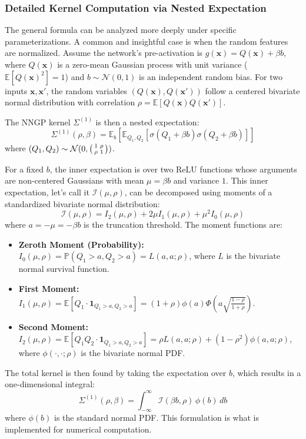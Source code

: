 \documentclass[12pt]{article}
\begin{document}
\subsubsection{Detailed Kernel Computation via Nested Expectation}
The general formula can be analyzed more deeply under specific parameterizations. A common and insightful case is when the random features are normalized. Assume the network's pre-activation is $g(\bm{x}) = Q(\bm{x}) + \beta b$, where $Q(\bm{x})$ is a zero-mean Gaussian process with unit variance ($\mathbb{E}[Q(\bm{x})^2]=1$) and $b \sim \mathcal{N}(0,1)$ is an independent random bias. For two inputs $\bm{x}, \bm{x}'$, the random variables $(Q(\bm{x}), Q(\bm{x}'))$ follow a centered bivariate normal distribution with correlation $\rho = \mathbb{E}[Q(\bm{x})Q(\bm{x}')]$.

The NNGP kernel $\Sigma^{(1)}$ is then a nested expectation:
\begin{equation}
    \Sigma^{(1)}(\rho, \beta) = \mathbb{E}_{b} \left[ \mathbb{E}_{Q_1, Q_2} \left[ \sigma(Q_1 + \beta b) \sigma(Q_2 + \beta b) \right] \right]
\end{equation}
where $(Q_1, Q_2) \sim \mathcal{N}(0, \begin{psmallmatrix} 1 & \rho \\ \rho & 1 \end{psmallmatrix})$.

For a fixed $b$, the inner expectation is over two ReLU functions whose arguments are non-centered Gaussians with mean $\mu = \beta b$ and variance $1$. This inner expectation, let's call it $\mathcal{I}(\mu, \rho)$, can be decomposed using moments of a standardized bivariate normal distribution:
\begin{equation}
    \mathcal{I}(\mu, \rho) = I_2(\mu, \rho) + 2\mu I_1(\mu, \rho) + \mu^2 I_0(\mu, \rho)
\end{equation}
where $a = -\mu = -\beta b$ is the truncation threshold. The moment functions are:
\begin{itemize}
    \item \textbf{Zeroth Moment (Probability):} $I_0(\mu, \rho) = \mathbb{P}(Q_1 > a, Q_2 > a) = L(a, a; \rho)$, where $L$ is the bivariate normal survival function.
    \item \textbf{First Moment:} $I_1(\mu, \rho) = \mathbb{E}[Q_1 \cdot \mathbf{1}_{Q_1>a, Q_2>a}] = (1+\rho)\phi(a)\Phi\left(a\sqrt{\frac{1-\rho}{1+\rho}}\right)$.
    \item \textbf{Second Moment:} $I_2(\mu, \rho) = \mathbb{E}[Q_1 Q_2 \cdot \mathbf{1}_{Q_1>a, Q_2>a}] = \rho L(a, a; \rho) + (1-\rho^2)\phi(a, a; \rho)$, where $\phi(\cdot,\cdot;\rho)$ is the bivariate normal PDF.
\end{itemize}
The total kernel is then found by taking the expectation over $b$, which results in a one-dimensional integral:
\begin{equation}
    \Sigma^{(1)}(\rho, \beta) = \int_{-\infty}^{\infty} \mathcal{I}(\beta b, \rho) \, \phi(b) \, db
\end{equation}
where $\phi(b)$ is the standard normal PDF. This formulation is what is implemented for numerical computation.
\end{document}
